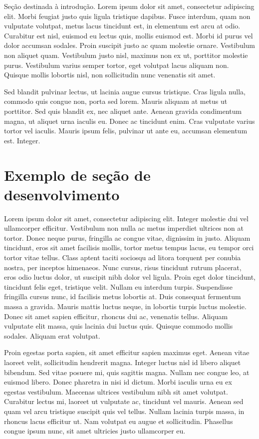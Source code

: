 \documentclass[a4paper]{article}
\begin{document}
Seção destinada à introdução. Lorem ipsum dolor sit amet, consectetur adipiscing elit. Morbi feugiat justo quis ligula tristique dapibus. Fusce interdum, quam non vulputate volutpat, metus lacus tincidunt est, in elementum est arcu at odio. Curabitur est nisl, euismod eu lectus quis, mollis euismod est. Morbi id purus vel dolor accumsan sodales. Proin suscipit justo ac quam molestie ornare. Vestibulum non aliquet quam. Vestibulum justo nisl, maximus non ex ut, porttitor molestie purus. Vestibulum varius semper tortor, eget volutpat lacus aliquam non. Quisque mollis lobortis nisl, non sollicitudin nunc venenatis sit amet.

Sed blandit pulvinar lectus, ut lacinia augue cursus tristique. Cras ligula nulla, commodo quis congue non, porta sed lorem. Mauris aliquam at metus ut porttitor. Sed quis blandit ex, nec aliquet ante. Aenean gravida condimentum magna, ut aliquet urna iaculis eu. Donec ac tincidunt enim. Cras vulputate varius tortor vel iaculis. Mauris ipsum felis, pulvinar ut ante eu, accumsan elementum est. Integer.

\section{Exemplo de seção de desenvolvimento}

Lorem ipsum \cite{exemplodereferencia} dolor sit amet, consectetur adipiscing elit. Integer molestie dui vel ullamcorper efficitur. Vestibulum non nulla ac metus imperdiet ultrices non at tortor. Donec neque purus, fringilla ac congue vitae, dignissim in justo. Aliquam tincidunt, eros sit amet facilisis mollis, tortor metus tempus lacus, eu tempor orci tortor vitae tellus. Class aptent taciti sociosqu ad litora torquent per conubia nostra, per inceptos himenaeos. Nunc cursus, risus tincidunt rutrum placerat, eros odio luctus dolor, ut suscipit nibh dolor vel ligula. Proin eget dolor tincidunt, tincidunt felis eget, tristique velit. Nullam eu interdum turpis. Suspendisse fringilla cursus nunc, id facilisis metus lobortis at. Duis consequat fermentum massa a gravida. Mauris mattis luctus neque, in lobortis turpis luctus molestie. Donec sit amet sapien efficitur, rhoncus dui ac, venenatis tellus. Aliquam vulputate elit massa, quis lacinia dui luctus quis. Quisque commodo mollis sodales. Aliquam erat volutpat.

Proin egestas porta sapien, sit amet efficitur sapien maximus eget. Aenean vitae laoreet velit, sollicitudin hendrerit magna. Integer luctus nisl id libero aliquet bibendum. Sed vitae posuere mi, quis sagittis magna. Nullam nec congue leo, at euismod libero. Donec pharetra in nisi id dictum. Morbi iaculis urna eu ex egestas vestibulum. Maecenas ultrices vestibulum nibh sit amet volutpat. Curabitur lectus mi, laoreet ut vulputate ac, tincidunt vel mauris. Aenean sed quam vel arcu tristique suscipit quis vel tellus. Nullam lacinia turpis massa, in rhoncus lacus efficitur ut. Nam volutpat eu augue et sollicitudin. Phasellus congue ipsum nunc, sit amet ultricies justo ullamcorper eu.
\end{document}
